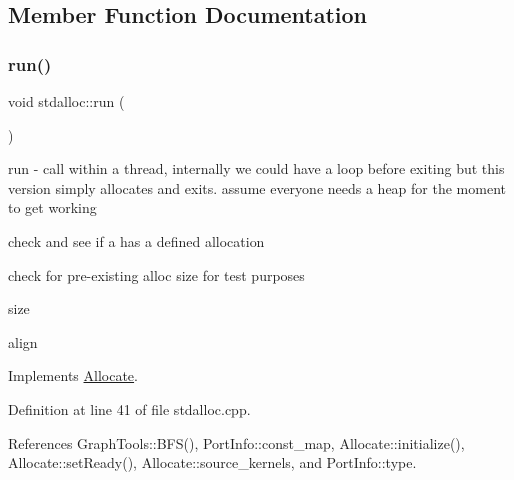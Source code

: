 \subsection{Member Function Documentation}
\hypertarget{classstdalloc_a60438b15948ce354b52b03ba6d975de0}{}\label{classstdalloc_a60438b15948ce354b52b03ba6d975de0} 
\subsubsection{\texorpdfstring{run()}{run()}}
{\footnotesize\ttfamily void stdalloc\+::run (\begin{DoxyParamCaption}{ }\end{DoxyParamCaption})\hspace{0.3cm}{\ttfamily [virtual]}}

run -\/ call within a thread, internally we could have a loop before exiting but this version simply allocates and exits. assume everyone needs a heap for the moment to get working

check and see if a has a defined allocation

check for pre-\/existing alloc size for test purposes

size

align 

Implements \hyperlink{class_allocate_a44f9b51c382fec159233609e21b9d272}{Allocate}.



Definition at line 41 of file stdalloc.\+cpp.



References Graph\+Tools\+::\+B\+F\+S(), Port\+Info\+::const\+\_\+map, Allocate\+::initialize(), Allocate\+::set\+Ready(), Allocate\+::source\+\_\+kernels, and Port\+Info\+::type.


